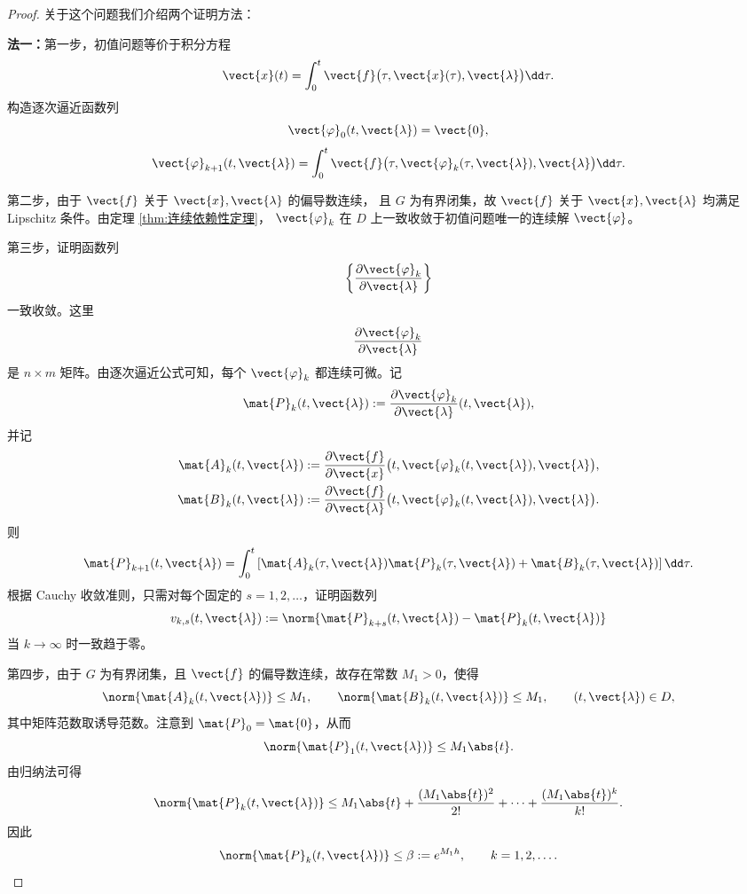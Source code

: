 \begin{proof}
	关于这个问题我们介绍两个证明方法：
	
	\textbf{法一：}第一步，初值问题等价于积分方程
	\[
		\vect{x}(t)=\int_0^t
		\vect{f}\bigl(\tau,\vect{x}(\tau),\vect{\lambda}\bigr)\dd\tau.
	\]
	构造逐次逼近函数列
	\[
		\vect{\varphi}_0(t,\vect{\lambda})=\vect{0},
	\]
	\[
		\vect{\varphi}_{k+1}(t,\vect{\lambda})
		=\int_0^t
		\vect{f}\bigl(
		\tau,\vect{\varphi}_k(\tau,\vect{\lambda}),\vect{\lambda}
		\bigr)\dd\tau.
	\]

	第二步，由于 $\vect{f}$ 关于 $\vect{x},\vect{\lambda}$ 的偏导数连续，
	且 $G$ 为有界闭集，故 $\vect{f}$ 关于 $\vect{x},\vect{\lambda}$
	均满足 Lipschitz 条件。由定理 \ref{thm:连续依赖性定理}，
	$\vect{\varphi}_k$ 在 $D$ 上一致收敛于初值问题唯一的连续解
	$\vect{\varphi}$。

	第三步，证明函数列
	\[
		\left\{
		\dfrac{\partial\vect{\varphi}_k}{\partial\vect{\lambda}}
		\right\}
	\]
	一致收敛。这里
	\[
		\dfrac{\partial\vect{\varphi}_k}
		{\partial\vect{\lambda}}
	\]
	是 $n\times m$ 矩阵。由逐次逼近公式可知，每个
	$\vect{\varphi}_k$ 都连续可微。记
	\[
		\mat{P}_k(t,\vect{\lambda})
		\mathrel{:=}
		\dfrac{\partial\vect{\varphi}_k}
		{\partial\vect{\lambda}}(t,\vect{\lambda}),
	\]
	并记
	\[
		\begin{aligned}
		\mat{A}_k(t,\vect{\lambda})
		&\mathrel{:=}
		\dfrac{\partial\vect{f}}{\partial\vect{x}}
		\bigl(t,\vect{\varphi}_k(t,\vect{\lambda}),\vect{\lambda}\bigr),\\
		\mat{B}_k(t,\vect{\lambda})
		&\mathrel{:=}
		\dfrac{\partial\vect{f}}{\partial\vect{\lambda}}
		\bigl(t,\vect{\varphi}_k(t,\vect{\lambda}),\vect{\lambda}\bigr).
		\end{aligned}
	\]
	则
	\[
		\mat{P}_{k+1}(t,\vect{\lambda})
		=\int_0^t\left[
		\mat{A}_k(\tau,\vect{\lambda})
		\mat{P}_k(\tau,\vect{\lambda})
		+\mat{B}_k(\tau,\vect{\lambda})
		\right]\dd\tau.
	\]
	根据 Cauchy 收敛准则，只需对每个固定的
	$s=1,2,\ldots$，证明函数列
	\[
		v_{k,s}(t,\vect{\lambda})\mathrel{:=}
		\norm{
		\mat{P}_{k+s}(t,\vect{\lambda})
		-\mat{P}_k(t,\vect{\lambda})
		}
	\]
	当 $k\to\infty$ 时一致趋于零。

	第四步，由于 $G$ 为有界闭集，且 $\vect{f}$ 的偏导数连续，故存在常数
	$M_1>0$，使得
	\[
		\norm{\mat{A}_k(t,\vect{\lambda})}\leq M_1,
		\qquad
		\norm{\mat{B}_k(t,\vect{\lambda})}\leq M_1,
		\qquad (t,\vect{\lambda})\in D,
	\]
	其中矩阵范数取诱导范数。注意到 $\mat{P}_0=\mat{0}$，从而
	\[
		\norm{\mat{P}_1(t,\vect{\lambda})}
		\leq M_1\abs{t}.
	\]
	由归纳法可得
	\[
		\norm{\mat{P}_k(t,\vect{\lambda})}
		\leq M_1\abs{t}
		+\dfrac{(M_1\abs{t})^2}{2!}
		+\cdots
		+\dfrac{(M_1\abs{t})^k}{k!}.
	\]
	因此
	\[
		\norm{\mat{P}_k(t,\vect{\lambda})}
		\leq\beta\mathrel{:=}e^{M_1h},
		\qquad k=1,2,\ldots.
	\]


\end{proof}
